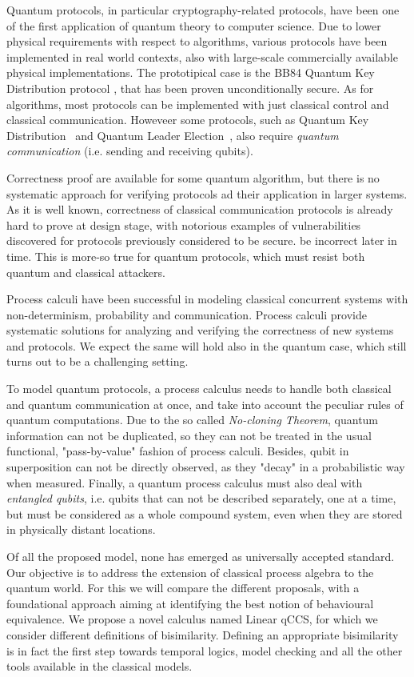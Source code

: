 Quantum protocols, in particular cryptography-related protocols, have been  one of the first application 
of quantum theory to computer science. Due to lower physical
requirements with respect to algorithms, various protocols have been implemented
in real world contexts, also with large-scale commercially available physical implementations.
The prototipical case is the BB84 Quantum Key Distribution
protocol \cite{shor_simple_2000}, that has been proven unconditionally secure. As for algorithms, most protocols can be implemented with just classical control and classical communication. Howeveer some protocols, such as Quantum Key
Distribution~\cite{poppe_practical_2004} and Quantum Leader
Election~\cite{tani_exact_2012}, also require \textit{quantum communication} (i.e. sending and receiving qubits).


Correctness proof are available for some quantum algorithm, but there is no systematic approach for verifying protocols ad their application in larger systems.
As it is well known, correctness of classical communication protocols is already hard to prove at design stage, with notorious examples of vulnerabilities discovered for protocols previously considered to be secure.
be incorrect later in time. This is more-so true for quantum protocols, which must resist both quantum and classical attackers.


Process calculi have been successful in modeling classical concurrent systems with non-determinism, probability and communication. Process calculi provide systematic solutions for analyzing and verifying the correctness of new systems and protocols. We expect the same will hold also in the quantum case, which still turns out to be a challenging setting.


To model quantum protocols, a process calculus needs to handle both classical and quantum communication at once, and take into account the peculiar rules of quantum computations. Due to the so called \textit{No-cloning Theorem}, quantum information can not be duplicated, so they can not be treated in the usual functional, "pass-by-value" fashion of process calculi. Besides, qubit in superposition can not be directly observed, as they "decay" in a probabilistic way when measured. Finally, a quantum process calculus must also deal with \textit{entangled qubits}, i.e. qubits that can not be described separately, one at a time, but must be considered as a whole compound system, even when they are stored in physically distant locations.

Of all the proposed model, none has emerged as universally accepted standard. Our objective is to address the extension of classical process algebra to the quantum world. For this we will compare the different proposals, with a foundational approach aiming at identifying the best notion of behavioural equivalence. We propose a novel calculus named Linear qCCS, for which we consider different definitions of bisimilarity.
Defining an appropriate bisimilarity is in fact the first step towards temporal logics, model checking and all the other tools available in the classical models.


